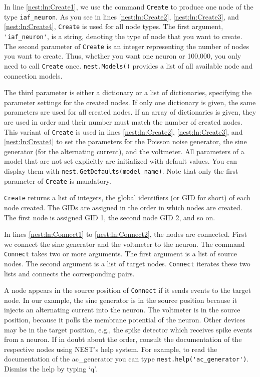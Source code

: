 \documentclass{article}
\begin{document}
In line \ref{nest:ln:Create1}, we use the command \lstinline!Create!
to produce one node of the type \lstinline!iaf_neuron!. As you see in
lines \ref{nest:ln:Create2}, \ref{nest:ln:Create3}, and
\ref{nest:ln:Create4}, \lstinline!Create! is used for all node types.
The first argument, \lstinline!'iaf_neuron'!, is a string, denoting
the type of node that you want to create.
The second parameter of \lstinline!Create! is an integer representing
the number of nodes you want to create. Thus, whether you want one neuron
or 100,000, you only need to call \lstinline!Create! once.
\lstinline!nest.Models()! provides a list of all available node and
connection models.

The third parameter is either a dictionary or a list of dictionaries,
specifying the parameter settings for the created nodes. If only one
dictionary is given, the same parameters are used for all created
nodes. If an array of dictionaries is given, they are used in order
and their number must match the number of created nodes. This variant
of \lstinline!Create! is used in lines \ref{nest:ln:Create2},
\ref{nest:ln:Create3}, and \ref{nest:ln:Create4} to set the parameters
for the Poisson noise generator, the sine generator (for the
alternating current), and the voltmeter. All parameters of a model
that are not set explicitly are initialized with default values. You
can display them with
{  %
\lstinline!nest.GetDefaults(model_name)!}.
Note that only the first
parameter of \lstinline!Create! is mandatory. 

\lstinline!Create! returns a list of integers, the  global
identifiers (or GID for short)
 of each node created. The GIDs are
assigned in the order in which nodes are created. The first node is
assigned GID 1, the second node GID 2, and so on.

In lines \ref{nest:ln:Connect1} to \ref{nest:ln:Connect2}, the nodes
are connected. First we connect the sine generator and the voltmeter
to the neuron. The command  \lstinline!Connect! takes two or more
arguments. The first argument is a list of source nodes. The second
argument is a list of target nodes. \lstinline!Connect! iterates these
two lists and connects the corresponding pairs.

A node appears in the source position of \lstinline!Connect! if it sends events
to the target node. In our example, the sine generator is in the
source position because it injects an alternating current into the
neuron. The voltmeter is in the source position, because it polls the
membrane potential of the neuron. Other devices may be in the target
position, e.g., the spike detector which receives spike events from a
neuron. If in doubt about the order, consult the documentation of the
respective nodes using NEST's help system. For example, to read the
documentation of the ac\_generator you can type
\lstinline!nest.help('ac_generator')!. 
Dismiss the help by typing `q'.
\end{document}
